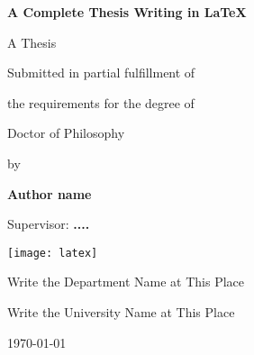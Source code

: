 
\begin{titlepage}	
	\centering 	
	{\LARGE \bfseries A Complete Thesis Writing in \LaTeX}
	\vspace{3\baselineskip}
	
	{\Large A Thesis}
	\vspace{3\baselineskip}
	
	{\Large Submitted in partial fulfillment of}
	\vspace{0.5\baselineskip}
	
	{\Large  the requirements for the degree of }
	\vspace{3.5\baselineskip}
	
	{\Large Doctor of Philosophy}
	\vspace{0.5\baselineskip}
	
	{\Large by}
	\vspace{0.5\baselineskip}
	
	{\Large \bfseries Author name}
	\vspace{3\baselineskip}
	
	{\Large Supervisor: \bfseries ....}
	\vspace{3\baselineskip}
	
	\texttt{[image: latex]}
	\vspace{3\baselineskip}
	
	{\Large Write the Department Name at This Place}
	\vspace{0.5\baselineskip}
	
	{\Large Write the University Name at This Place}
	\vspace{3\baselineskip}
	
	{\Large \today}    
	
\end{titlepage}		